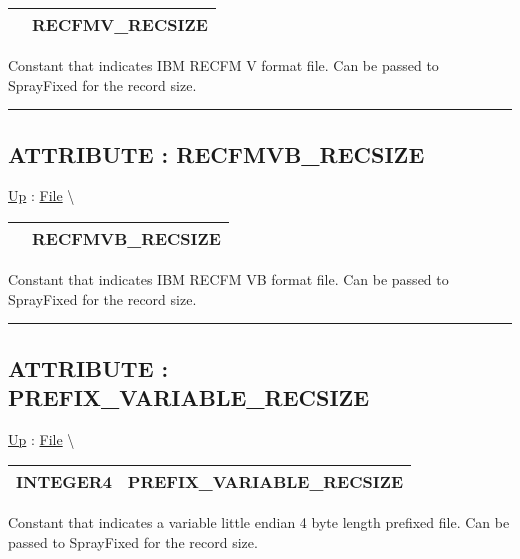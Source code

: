 {\renewcommand{\arraystretch}{1.5}
\begin{tabularx}{\textwidth}{|>{\raggedright\arraybackslash}l|X|}
\hline
\hspace{0pt} & RECFMV\_RECSIZE \\
\hline
\end{tabularx}
}

\par
Constant that indicates IBM RECFM V format file. Can be passed to SprayFixed for the record size.


\rule{\linewidth}{0.5pt}
\subsection*{ATTRIBUTE : RECFMVB\_RECSIZE}
\hypertarget{ecldoc:file.recfmvb_recsize}{}
\hyperlink{ecldoc:File}{Up} :
\hspace{0pt} \hyperlink{ecldoc:File}{File} \textbackslash 

{\renewcommand{\arraystretch}{1.5}
\begin{tabularx}{\textwidth}{|>{\raggedright\arraybackslash}l|X|}
\hline
\hspace{0pt} & RECFMVB\_RECSIZE \\
\hline
\end{tabularx}
}

\par
Constant that indicates IBM RECFM VB format file. Can be passed to SprayFixed for the record size.


\rule{\linewidth}{0.5pt}
\subsection*{ATTRIBUTE : PREFIX\_VARIABLE\_RECSIZE}
\hypertarget{ecldoc:file.prefix_variable_recsize}{}
\hyperlink{ecldoc:File}{Up} :
\hspace{0pt} \hyperlink{ecldoc:File}{File} \textbackslash 

{\renewcommand{\arraystretch}{1.5}
\begin{tabularx}{\textwidth}{|>{\raggedright\arraybackslash}l|X|}
\hline
\hspace{0pt}INTEGER4 & PREFIX\_VARIABLE\_RECSIZE \\
\hline
\end{tabularx}
}

\par
Constant that indicates a variable little endian 4 byte length prefixed file. Can be passed to SprayFixed for the record size.


